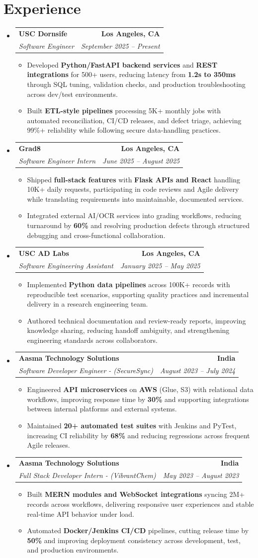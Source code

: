 \documentclass[letterpaper,10pt]{article}
\makeatletter
\newcommand{\resumeItem}[1]{\item\small{{#1 \vspace{-2pt}}}}
\newcommand{\resumeSubheading}[4]{\vspace{-1pt}\item\begin{tabular*}{1.0\textwidth}[t]{l@{\extracolsep{\fill}}r}\textbf{#1} & \textbf{\small #2} \\\textit{\small#3} & \textit{\small #4} \\\end{tabular*}\vspace{-2pt}}
\newcommand{\resumeSubHeadingListStart}{\begin{itemize}[leftmargin=0.0in, label={}]}
\newcommand{\resumeSubHeadingListEnd}{\end{itemize}}
\newcommand{\resumeItemListStart}{\begin{itemize}[leftmargin=0.15in,label=\textbullet,itemsep=2pt,topsep=0pt,parsep=0pt,partopsep=0pt]}
\newcommand{\resumeItemListEnd}{\end{itemize}\vspace{-4pt}}
\makeatother
\begin{document}
\section{Experience}
\resumeSubHeadingListStart
\resumeSubheading{USC Dornsife}{Los Angeles, CA}{Software Engineer}{September 2025 -- Present}
\resumeItemListStart
\resumeItem{Developed \textbf{Python/FastAPI backend services} and \textbf{REST integrations} for 500+ users, reducing latency from \textbf{1.2s to 350ms} through SQL tuning, validation checks, and production troubleshooting across dev/test environments.}
\resumeItem{Built \textbf{ETL-style pipelines} processing 5K+ monthly jobs with automated reconciliation, CI/CD releases, and defect triage, achieving 99\%+ reliability while following secure data-handling practices.}
\resumeItemListEnd
\resumeSubheading{Grad8}{Los Angeles, CA}{Software Engineer Intern}{June 2025 -- August 2025}
\resumeItemListStart
\resumeItem{Shipped \textbf{full-stack features} with \textbf{Flask APIs and React} handling 10K+ daily requests, participating in code reviews and Agile delivery while translating requirements into maintainable, documented services.}
\resumeItem{Integrated external AI/OCR services into grading workflows, reducing turnaround by \textbf{60\%} and resolving production defects through structured debugging and cross-functional collaboration.}
\resumeItemListEnd
\resumeSubheading{USC AD Labs}{Los Angeles, CA}{Software Engineering Assistant}{January 2025 -- May 2025}
\resumeItemListStart
\resumeItem{Implemented \textbf{Python data pipelines} across 100K+ records with reproducible test scenarios, supporting quality practices and incremental delivery in a research engineering team.}
\resumeItem{Authored technical documentation and review-ready reports, improving knowledge sharing, reducing handoff ambiguity, and strengthening engineering standards across collaborators.}
\resumeItemListEnd
\resumeSubheading{Aasma Technology Solutions}{India}{Software Developer Engineer - (SecureSync)}{August 2023 -- July 2024}
\resumeItemListStart
\resumeItem{Engineered \textbf{API microservices} on \textbf{AWS} (Glue, S3) with relational data workflows, improving response time by \textbf{30\%} and supporting integrations between internal platforms and external systems.}
\resumeItem{Maintained \textbf{20+ automated test suites} with Jenkins and PyTest, increasing CI reliability by \textbf{68\%} and reducing regressions across frequent Agile releases.}
\resumeItemListEnd
\resumeSubheading{Aasma Technology Solutions}{India}{Full Stack Developer Intern - (VibrantChem)}{May 2023 -- August 2023}
\resumeItemListStart
\resumeItem{Built \textbf{MERN modules and WebSocket integrations} syncing 2M+ records across workflows, delivering responsive user experiences and stable real-time API behavior under load.}
\resumeItem{Automated \textbf{Docker/Jenkins CI/CD} pipelines, cutting release time by \textbf{50\%} and improving deployment consistency across development, test, and production environments.}
\resumeItemListEnd
\resumeSubHeadingListEnd
\vspace{-14pt}
\end{document}
